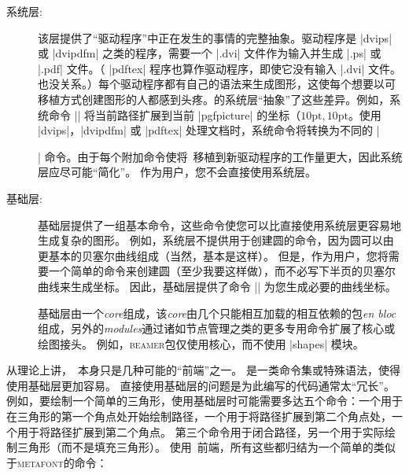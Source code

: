 \begin{description}
    \item[系统层:]该层提供了“驱动程序”中正在发生的事情的完整抽象。驱动程序是 |dvips| 或 |dvipdfm| 之类的程序，需要一个 |.dvi| 文件作为输入并生成 |.ps| 或 |.pdf| 文件。（ |pdftex| 程序也算作驱动程序，即使它没有输入 |.dvi| 文件。也没关系。）每个驱动程序都有自己的语法来生成图形，这使每个想要以可移植方式创建图形的人都感到头疼。\pgfname 的系统层“抽象”了这些差异。例如，系统命令 |\pgfsys@lineto{10pt}{10pt}| 将当前路径扩展到当前 |{pgfpicture}| 的坐标$（10\mathrm{pt},10\mathrm{pt}$。使用 |dvips|，|dvipdfm| 或 |pdftex| 处理文档时，系统命令将转换为不同的 |\special| 命令。由于每个附加命令使将\pgfname\ 移植到新驱动程序的工作量更大，因此系统层应尽可能“简化”。
    作为用户，您不会直接使用系统层。
    \item[基础层:] 基础层提供了一组基本命令，这些命令使您可以比直接使用系统层更容易地生成复杂的图形。 例如，系统层不提供用于创建圆的命令，因为圆可以由更基本的贝塞尔曲线组成（当然，基本是这样）。 但是，作为用户，您将需要一个简单的命令来创建圆（至少我要这样做），而不必写下半页的贝塞尔曲线来生成坐标。 因此，基础层提供了命令 |\pgfpathcircle| 为您生成必要的曲线坐标。

    基础层由一个\emph{core}组成，该\emph{core}由几个只能相互加载的相互依赖的包\emph{en bloc}组成，另外的\emph{modules}通过诸如节点管理之类的更多专用命令扩展了核心或绘图接头。 例如，\textsc{beamer}包仅使用核心，而不使用 |shapes| 模块。
\end{description}


从理论上讲，\tikzname\ 本身只是几种可能的``前端''之一。 是一类命令集或特殊语法，使得使用基础层更加容易。 直接使用基础层的问题是为此编写的代码通常太``冗长''。 例如，要绘制一个简单的三角形，使用基础层时可能需要多达五个命令：一个用于在三角形的第一个角点处开始绘制路径，一个用于将路径扩展到第二个角点处，一个用于将路径扩展到第二个角点。 第三个命令用于闭合路径，另一个用于实际绘制三角形（而不是填充三角形）。 使用\tikzname\ 前端，所有这些都归结为一个简单的类似于\textsc{metafont}的命令：

